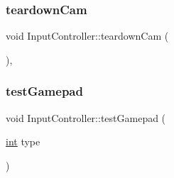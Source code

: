 \subsubsection{\texorpdfstring{teardown\+Cam}{teardownCam}}
{\footnotesize\ttfamily void Input\+Controller\+::teardown\+Cam (\begin{DoxyParamCaption}{ }\end{DoxyParamCaption})\hspace{0.3cm}{\ttfamily [private]}, {\ttfamily [slot]}}

\mbox{\label{class_q_g_b_a_1_1_input_controller_abd049f5661c769b2d4981b0a28e95221}} 
\subsubsection{\texorpdfstring{test\+Gamepad}{testGamepad}}
{\footnotesize\ttfamily void Input\+Controller\+::test\+Gamepad (\begin{DoxyParamCaption}\item[{\mbox{\hyperlink{ioapi_8h_a787fa3cf048117ba7123753c1e74fcd6}{int}}}]{type }\end{DoxyParamCaption})\hspace{0.3cm}{\ttfamily [slot]}}

